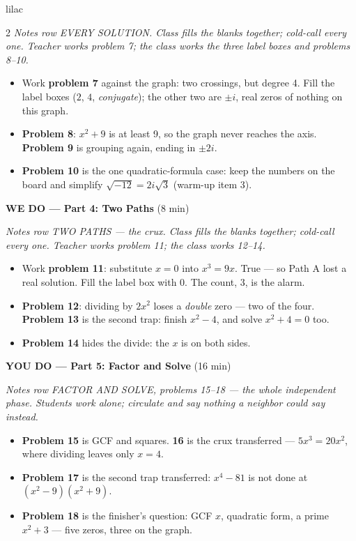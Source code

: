 \documentclass[10pt]{article}
\begin{document}
\begin{skillbox}{lilac}
\begin{multicols}{2}
\textit{Notes row EVERY SOLUTION. Class fills the blanks together; cold-call every one.
Teacher works problem 7; the class works the three label boxes and problems 8--10.}
\begin{itemize}
  \item Work \textbf{problem 7} against the graph: two crossings, but degree 4. Fill the label
        boxes ($2$, $4$, \textit{conjugate}); the other two are $\pm i$, real zeros of nothing
        on this graph.
  \item \textbf{Problem 8}: $x^2 + 9$ is at least 9, so the graph never reaches the axis.
        \textbf{Problem 9} is grouping again, ending in $\pm 2i$.
  \item \textbf{Problem 10} is the one quadratic-formula case: keep the numbers on the board
        and simplify $\sqrt{-12} = 2i\sqrt{3}$ (warm-up item 3).
\end{itemize}

\textbf{WE DO --- Part 4: Two Paths} (8 min)

\textit{Notes row TWO PATHS --- the crux. Class fills the blanks together; cold-call every
one. Teacher works problem 11; the class works 12--14.}
\begin{itemize}
  \item Work \textbf{problem 11}: substitute $x = 0$ into $x^3 = 9x$. True --- so Path A lost
        a real solution. Fill the label box with $0$. The count, 3, is the alarm.
  \item \textbf{Problem 12}: dividing by $2x^2$ loses a \emph{double} zero --- two of the four.
        \textbf{Problem 13} is the second trap: finish $x^2 - 4$, and solve $x^2 + 4 = 0$ too.
  \item \textbf{Problem 14} hides the divide: the $x$ is on both sides.
\end{itemize}

\textbf{YOU DO --- Part 5: Factor and Solve} (16 min)

\textit{Notes row FACTOR AND SOLVE, problems 15--18 --- the whole independent phase.
Students work alone; circulate and say nothing a neighbor could say instead.}
\begin{itemize}
  \item \textbf{Problem 15} is GCF and squares. \textbf{16} is the crux transferred ---
        $5x^3 = 20x^2$, where dividing leaves only $x = 4$.
  \item \textbf{Problem 17} is the second trap transferred: $x^4 - 81$ is not done at
        $(x^2 - 9)(x^2 + 9)$.
  \item \textbf{Problem 18} is the finisher's question: GCF $x$, quadratic form, a prime
        $x^2 + 3$ --- five zeros, three on the graph.
\end{itemize}
\end{multicols}
\end{skillbox}
\end{document}
